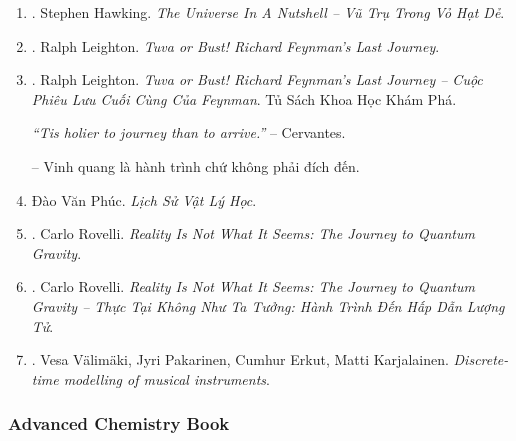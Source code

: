 \documentclass{article}
\begin{document}
\begin{enumerate}
	\item \cite{Hawking_vttvhd}. {\sc Stephen Hawking}. {\it The Universe In A Nutshell -- Vũ Trụ Trong Vỏ Hạt Dẻ}.\hfill{\sf[done]}
	
	\item \cite{Leighton_Feyman_last_journey}. {\sc Ralph Leighton}. {\it Tuva or Bust! Richard Feynman's Last Journey}.
	
	\item \cite{Leighton_Feyman_last_journey_VN}. {\sc Ralph Leighton}. {\it Tuva or Bust! Richard Feynman's Last Journey -- Cuộc Phiêu Lưu Cuối Cùng Của Feynman}. Tủ Sách Khoa Học Khám Phá.\hfill{\sf[done]}
	
	{\it``Tis holier to journey than to arrive.''} -- {\sc Cervantes.}
	
	-- Vinh quang là hành trình chứ không phải đích đến. \cite[Suy ngẫm 2000, p. 269]{Leighton_Feyman_last_journey_VN}
	
	\item Đào Văn Phúc. {\it Lịch Sử Vật Lý Học}.
	
	\item \cite{Rovelli_reality}. {\sc Carlo Rovelli}. {\it Reality Is Not What It Seems: The Journey to Quantum Gravity}.
	
	\item \cite{Rovelli_reality_VN}. {\sc Carlo Rovelli}. {\it Reality Is Not What It Seems: The Journey to Quantum Gravity -- Thực Tại Không Như Ta Tưởng: Hành Trình Đến Hấp Dẫn Lượng Tử}.\hfill{\sf[done]}
	
	\item \cite{Valimaki_Pakarinen_Erkut_Karjalainen2006}. {\sc Vesa V\"alim\"aki, Jyri Pakarinen, Cumhur Erkut, Matti Karjalainen}. {\it Discrete-time modelling of musical instruments}.
\end{enumerate}


\subsubsection{Advanced Chemistry Book}
\end{document}
